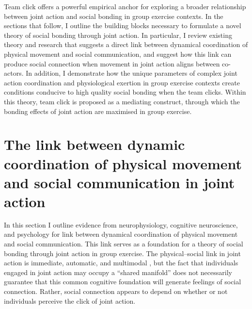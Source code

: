 \begin{CJK}{UTF8}{gbsn}
Team click offers a powerful empirical anchor for exploring a broader relationship between joint action and social bonding in group exercise contexts.  In the sections that follow, I outline the building blocks necessary to formulate a novel theory of social bonding through joint action.  In particular, I review existing theory and research that suggests a direct link between dynamical coordination of physical movement and social communication, and suggest how this link can produce social connection when movement in joint action aligns between co-actors.  In addition, I demonstrate how the unique parameters of complex joint action coordination and physiological exertion in group exercise contexts create conditions conducive to high quality social bonding when the team clicks.  Within this theory, team click is proposed as a mediating construct, through which the bonding effects of joint action are maximised in group exercise.


















\section{The link between dynamic coordination of physical movement and social communication in joint action \label{sect:physicalMovementSocialCommunication}}

In this section I outline evidence from neurophysiology, cognitive neuroscience, and psychology for link between dynamical coordination of physical movement and social communication.  This link serves as a foundation for a theory of social bonding through joint action in group exercise.  The physical--social link in joint action is immediate, automatic, and multimodal \citep{Semin2008}, but the fact that individuals engaged in joint action may occupy a ``shared manifold'' \citep[see][]{Gallese2003,Friston2015} does not necessarily guarantee that this common cognitive foundation will generate feelings of social connection.  Rather, social connection appears to depend on whether or not individuals perceive the click of joint action.


\end{CJK}
